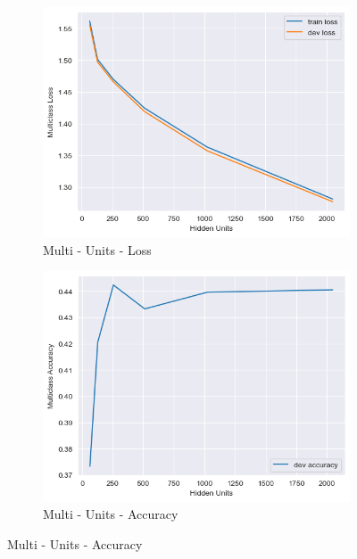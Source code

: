 \documentclass[12pt]{article}
\theoremstyle{definitionstyle}
\begin{document}
\begin{enumerate}
\begin{figure}[H]
            \begin{subfigure}{0.35\textwidth}
                \includegraphics[width=\textwidth]{images/multi_units_loss.png}
                \caption{Multi - Units - Loss}
            \end{subfigure}
            \hfill
            \begin{subfigure}{0.35\textwidth}
                \includegraphics[width=\textwidth]{images/multi_units_acc.png}
                \caption{Multi - Units - Accuracy}
            \end{subfigure}
        

\end{figure}
\end{enumerate}
\end{document}
